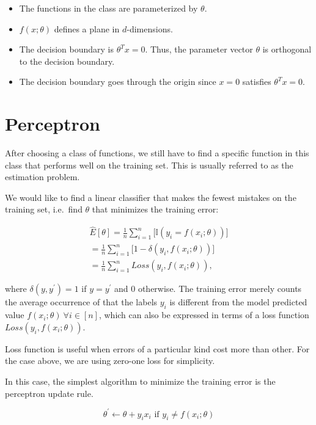 \documentclass[12pt,a4paper]{article}
\begin{document}
\begin{itemize}
\item
  The functions in the class are parameterized by \(\theta\).
\item
  \(f(x;\theta)\) defines a plane in \(d\)-dimensions.
\item
  The decision boundary is \(\theta^Tx=0.\) Thus, the parameter vector
  \(\theta\) is orthogonal to the decision boundary.
\item
  The decision boundary goes through the origin since \(x=0\) satisfies
  \(\theta^Tx=0.\)
\end{itemize}



\section{Perceptron}

After choosing a class of functions, we still have to find a specific
function in this class that performs well on the training set. This is
usually referred to as the estimation problem.

We would like to find a linear classifier that makes the fewest mistakes
on the training set, i.e.~find \(\theta\) that minimizes the training
error:

\begin{align} \hat{E}[\theta]=\frac{1}{n} \displaystyle\sum_{i=1}^n \big[\mathbb{I}(y_i=f(x_i;\theta))\big]\\=\frac{1}{n}\displaystyle\sum_{i=1}^n \big[1-\delta(y_i, f(x_i;\theta))\big]\\=\frac{1}{n}\displaystyle\sum_{i=1}^n Loss(y_i, f(x_i;\theta))\text{,}\end{align}

where \(\delta(y, y^\prime) =1\) if \(y=y^\prime\) and 0 otherwise. The
training error merely counts the average occurrence of that the labels
\(y_i\) is different from the model predicted value
\(f(x_i; \theta)\ \forall i \in [n]\), which can also be expressed in
terms of a loss function \(Loss(y_i, f(x_i;\theta))\).

Loss function is useful when errors of a particular kind cost more than
other. For the case above, we are using zero-one loss for simplicity.

In this case, the simplest algorithm to minimize the training error is
the perceptron update rule.

\begin{equation}\theta^\prime \leftarrow \theta + y_ix_i \text{ if } y_i \neq f(x_i;\theta)\end{equation}
\end{document}
